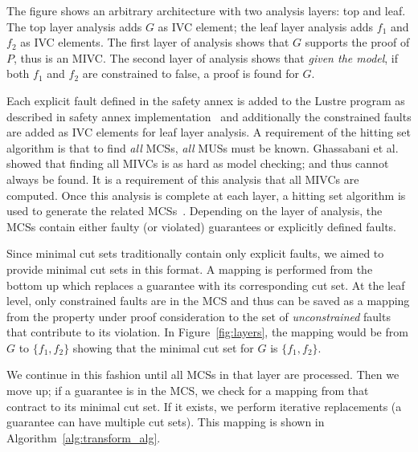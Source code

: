 The figure shows an arbitrary architecture with two analysis layers: top and leaf. The top layer analysis adds $G$ as IVC element; the leaf layer analysis adds $f_1$ and $f_2$ as IVC elements. The first layer of analysis shows that $G$ supports the proof of $P$, thus is an MIVC. The second layer of analysis shows that \emph{given the model}, if both $f_1$ and $f_2$ are constrained to false, a proof is found for $G$. 

Each explicit fault defined in the safety annex is added to the Lustre program as described in safety annex implementation~\cite{Stewart17:IMBSA,stewart2020safety} and additionally the constrained faults are added as IVC elements for leaf layer analysis. A requirement of the hitting set algorithm is that to find \emph{all} MCSs, \emph{all} MUSs must be known. Ghassabani et al.~\cite{Ghassabani2017EfficientGO} showed that finding all MIVCs is as hard as model checking; and thus cannot always be found. It is a requirement of this analysis that all MIVCs are computed. Once this analysis is complete at each layer, a hitting set algorithm is used to generate the related MCSs~\cite{gainer2017minimal}. Depending on the layer of analysis, the MCSs contain either faulty (or violated) guarantees or explicitly defined faults.

Since minimal cut sets traditionally contain only explicit faults, we aimed to provide minimal cut sets in this format. A mapping is performed from the bottom up which replaces a guarantee with its corresponding cut set. At the leaf level, only constrained faults are in the MCS and thus can be saved as a mapping from the property under proof consideration to the set of \emph{unconstrained} faults that contribute to its violation. In Figure~\ref{fig:layers}, the mapping would be from $G$ to $\{f_1, f_2\}$ showing that the minimal cut set for $G$ is $\{f_1, f_2\}$. 

We continue in this fashion until all MCSs in that layer are processed. Then we move up; if a guarantee is in the MCS, we check for a mapping from that contract to its minimal cut set. If it exists, we perform iterative replacements (a guarantee can have multiple cut sets).  This mapping is shown in Algorithm~\ref{alg:transform_alg}.

